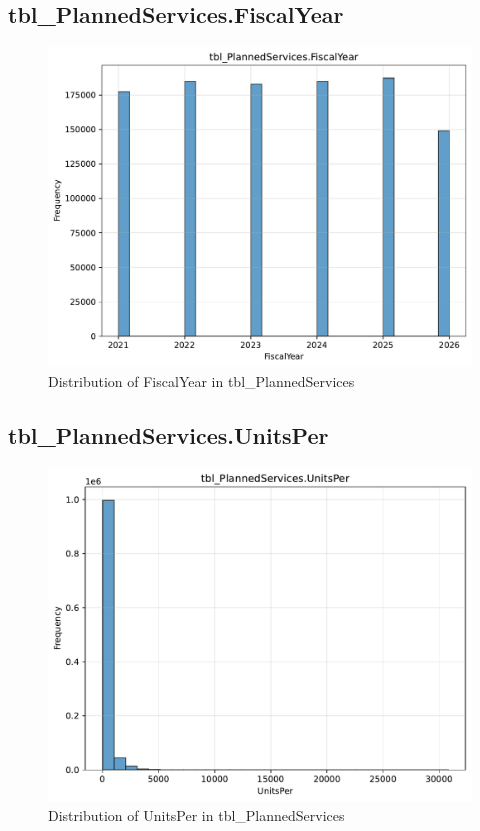 \subsection{tbl\_PlannedServices.FiscalYear}

\begin{figure}[htbp]
\centering
\includegraphics[width=\textwidth]{figures/dbo_tbl_PlannedServices_FiscalYear.pdf}
\caption{Distribution of FiscalYear in tbl\_PlannedServices}
\end{figure}\newpage

\subsection{tbl\_PlannedServices.UnitsPer}

\begin{figure}[htbp]
\centering
\includegraphics[width=\textwidth]{figures/dbo_tbl_PlannedServices_UnitsPer.pdf}
\caption{Distribution of UnitsPer in tbl\_PlannedServices}
\end{figure}\newpage

